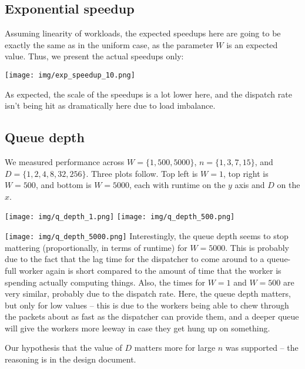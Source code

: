 \documentclass{article}
\begin{document}
\subsection*{Exponential speedup}
Assuming linearity of workloads, the expected speedups here are going to be exactly the same as in the uniform case, as the parameter $W$ is an expected value. Thus, we present the actual speedups only:

\texttt{[image: img/exp\_speedup\_10.png]}

As expected, the scale of the speedups is a lot lower here, and the dispatch rate isn't being hit as dramatically here due to load imbalance. 
\subsection*{Queue depth}
We measured performance across $W=\{1, 500, 5000\}$, $n=\{1, 3, 7, 15\}$, and $D=\{1,2,4,8,32,256\}$. Three plots follow. Top left is $W=1$, top right is $W=500$, and bottom is $W=5000$, each with runtime on the $y$ axis and $D$ on the $x$.

\texttt{[image: img/q\_depth\_1.png]}
\texttt{[image: img/q\_depth\_500.png]}

\texttt{[image: img/q\_depth\_5000.png]}
Interestingly, the queue depth seems to stop mattering (proportionally, in terms of runtime) for $W=5000$. This is probably due to the fact that the lag time for the dispatcher to come around to a queue-full worker again is short compared to the amount of time that the worker is spending actually computing things. Also, the times for $W=1$ and $W=500$ are very similar, probably due to the dispatch rate. Here, the queue depth matters, but only for low values -- this is due to the workers being able to chew through the packets about as fast as the dispatcher can provide them, and a deeper queue will give the workers more leeway in case they get hung up on something. 

Our hypothesis that the value of $D$ matters more for large $n$ was supported -- the reasoning is in the design document. 
\end{document}
